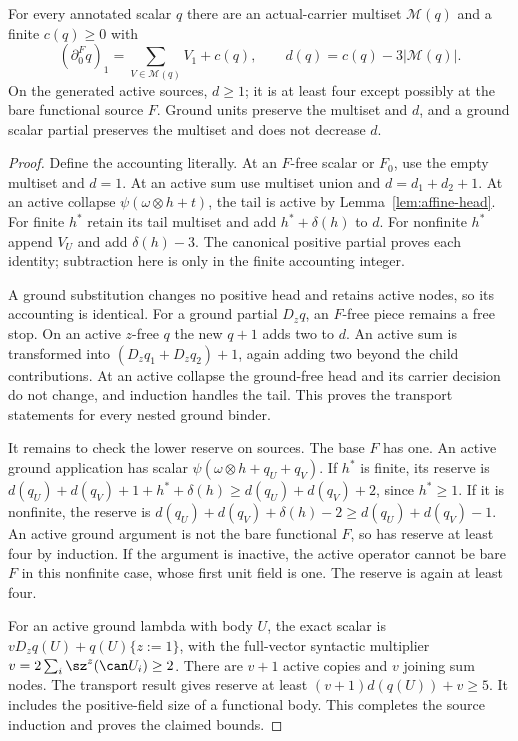 \begin{lemma}\label{lem:reserve}
For every annotated scalar $q$ there are an actual-carrier multiset
$\mathcal M(q)$ and a finite $c(q)\ge0$ with
\[
 (\partial^F_0q)_1=\sum_{V\in\mathcal M(q)}V_1+c(q),\qquad
 d(q)=c(q)-3|\mathcal M(q)|.
\]
On the generated active sources, $d\ge1$; it is at least four except
possibly at the bare functional source $F$.  Ground units preserve the
multiset and $d$, and a ground scalar partial preserves the multiset and
does not decrease $d$.
\end{lemma}
\begin{proof}
Define the accounting literally.  At an $F$-free scalar or $F_0$, use the
empty multiset and $d=1$.  At an active sum use multiset union and
$d=d_1+d_2+1$.  At an active collapse $\psi(\omega\otimes h+t)$, the
tail is active by Lemma~\ref{lem:affine-head}.  For finite $h^*$ retain its
tail multiset and add $h^*+\delta(h)$ to $d$.  For nonfinite $h^*$ append
$V_U$ and add $\delta(h)-3$.  The canonical positive partial proves each
identity; subtraction here is only in the finite accounting integer.

A ground substitution changes no positive head and retains active nodes,
so its accounting is identical.  For a ground partial $D_zq$, an $F$-free
piece remains a free stop.  On an active $z$-free $q$ the new $q+1$ adds
two to $d$.  An active sum is transformed into
$(D_zq_1+D_zq_2)+1$, again adding two beyond the child contributions.
At an active collapse the ground-free head and its carrier decision do
not change, and induction handles the tail.  This proves the transport
statements for every nested ground binder.

It remains to check the lower reserve on sources.  The base $F$ has one.
An active ground application has scalar $\psi(\omega\otimes h+q_U+q_V)$.
If $h^*$ is finite, its reserve is
$d(q_U)+d(q_V)+1+h^*+\delta(h)\ge d(q_U)+d(q_V)+2$,
since $h^*\ge1$.  If it is nonfinite, the reserve is
$d(q_U)+d(q_V)+\delta(h)-2\ge d(q_U)+d(q_V)-1$.
An active ground argument is not the bare functional $F$, so has reserve
at least four by induction.  If the argument is inactive, the active operator
cannot be bare $F$ in this nonfinite case, whose first unit field is one.
The reserve is again at least four.

For an active ground lambda with body $U$, the exact scalar is
$vD_zq(U)+q(U)\{z:=1\}$, with the full-vector syntactic multiplier
$v=2\sum_i\sz^z(\can U_i)\ge2$.  There are $v+1$ active copies and
$v$ joining sum nodes.  The transport result gives reserve at least
$(v+1)d(q(U))+v\ge5$.  It includes the positive-field size of a functional
body.  This completes the source induction and proves the claimed bounds.
\end{proof}

